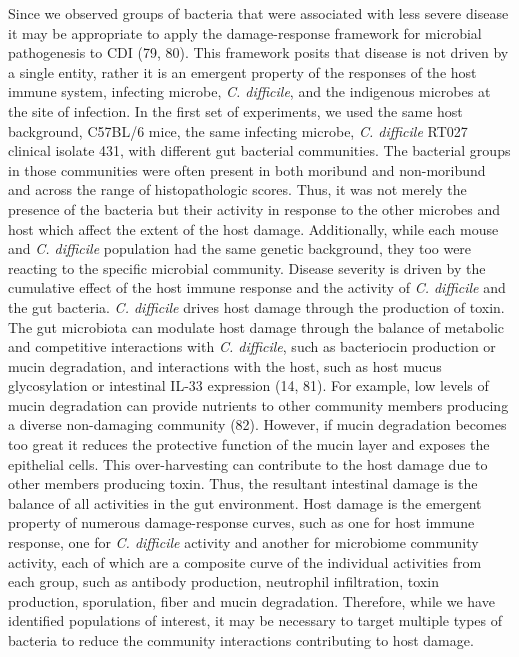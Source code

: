 \documentclass[
  12pt,
]{article}
\begin{document}
Since we observed groups of bacteria that were associated with less
severe disease it may be appropriate to apply the damage-response
framework for microbial pathogenesis to CDI (79, 80). This framework
posits that disease is not driven by a single entity, rather it is an
emergent property of the responses of the host immune system, infecting
microbe, \emph{C. difficile}, and the indigenous microbes at the site of
infection. In the first set of experiments, we used the same host
background, C57BL/6 mice, the same infecting microbe, \emph{C.
difficile} RT027 clinical isolate 431, with different gut bacterial
communities. The bacterial groups in those communities were often
present in both moribund and non-moribund and across the range of
histopathologic scores. Thus, it was not merely the presence of the
bacteria but their activity in response to the other microbes and host
which affect the extent of the host damage. Additionally, while each
mouse and \emph{C. difficile} population had the same genetic
background, they too were reacting to the specific microbial community.
Disease severity is driven by the cumulative effect of the host immune
response and the activity of \emph{C. difficile} and the gut bacteria.
\emph{C. difficile} drives host damage through the production of toxin.
The gut microbiota can modulate host damage through the balance of
metabolic and competitive interactions with \emph{C. difficile}, such as
bacteriocin production or mucin degradation, and interactions with the
host, such as host mucus glycosylation or intestinal IL-33 expression
(14, 81). For example, low levels of mucin degradation can provide
nutrients to other community members producing a diverse non-damaging
community (82). However, if mucin degradation becomes too great it
reduces the protective function of the mucin layer and exposes the
epithelial cells. This over-harvesting can contribute to the host damage
due to other members producing toxin. Thus, the resultant intestinal
damage is the balance of all activities in the gut environment. Host
damage is the emergent property of numerous damage-response curves, such
as one for host immune response, one for \emph{C. difficile} activity
and another for microbiome community activity, each of which are a
composite curve of the individual activities from each group, such as
antibody production, neutrophil infiltration, toxin production,
sporulation, fiber and mucin degradation. Therefore, while we have
identified populations of interest, it may be necessary to target
multiple types of bacteria to reduce the community interactions
contributing to host damage.
\end{document}
